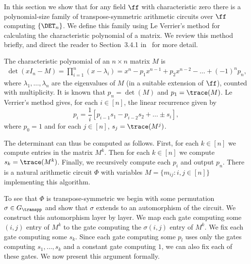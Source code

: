\documentclass{toc}
\begin{document}
In this section we show that for any field $\ff$ with characteristic zero there
is a polynomial-size family of transpose-symmetric arithmetic circuits over $\ff$
computing $\{\DET_n\}$. We define this family using Le Verrier's method for
calculating the characteristic polynomial of a matrix. We review this method
briefly, and direct the reader to Section~3.4.1 in~\cite{Holm10} for more
detail.

The characteristic polynomial of an $n \times n$ matrix $M$ is
\begin{align*}
  \det(x I_n - M) = \prod^n_{i = 1} (x - \lambda_i) =
   x^n - p_1x^{n-1} + p_2 x^{n -2} - \ldots + (-1)^{n}p_n,
\end{align*}
where $\lambda_1, \ldots , \lambda_n$ are the eigenvalues of $M$ (in a suitable extension of $\ff$), counted with multiplicity.
%
%
%
It is known that $p_n = \det (M)$ and $p_1 = \trace(M)$. Le
Verrier's method gives, for each $i \in [n]$, the linear recurrence given by
$$p_i = \frac{1}{i} [p_{i -1} s_1 - p_{i -2} s_2 + \ldots \pm s_i],$$
where $p_0 = 1$ and for each $j \in [n]$, $s_j = \trace(M^j)$.

The determinant can thus be computed as follows. First, for each $k \in [n]$ we
compute entries in the matrix $M^k$. Then for each $k \in [n]$ we compute $s_k =
\trace(M^k)$. Finally, we recursively compute each $p_i$ and output $p_n$. There
is a natural arithmetic circuit $\Phi$ with variables $M = \{m_{ij} : i, j \in
[n]\}$ implementing this algorithm.

To see that $\Phi$ is transpose-symmetric we begin with some permutation $\sigma
\in G_{\transpp}$ and show that $\sigma$ extends to an automorphism of the
circuit. We construct this automorphism layer by layer. We map each gate
computing some $(i, j)$ entry of $M^k$ to the gate computing the $\sigma (i, j)$
entry of $M^k$. We fix each gate computing some $s_k$. Since each gate computing
some $p_l$ uses only the gates computing $s_1, \ldots, s_k$ and a constant gate
computing $1$, we can also fix each of these gates. We now present this argument
formally.
\end{document}
